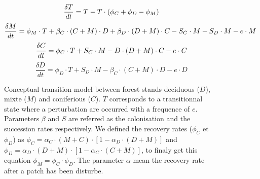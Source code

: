 \begin{figure}[!ht]
	\centering
	\begin{minipage}{0.45\linewidth}
		
	\end{minipage}
	\begin{minipage}[t]{1\linewidth}
\small{\begin{equation}
	 	\frac{\delta T}{dt} = T - T \cdot (\phi_C +\phi_D - \phi_M) \\
\end{equation}
\begin{equation}
		\frac{\delta M}{dt} = \phi_M\cdot T +  \beta_C \cdot (C+M)\cdot D + \beta_D\cdot (D+M)\cdot C - S_C\cdot M -S_D\cdot M - e\cdot M \\
\end{equation}
\begin{equation}
		\frac{\delta C}{dt} = \phi_C \cdot T + S_C\cdot M - D\cdot (D+M)\cdot C - e \cdot C \\
\end{equation}
\begin{equation}
		\frac{\delta D}{dt} = \phi_D \cdot T + S_D \cdot M - \beta_C \cdot (C+M) \cdot D - e \cdot D
\end{equation}}
	\end{minipage}

\caption{Conceptual transition model between forest stands deciduous ($D$), mixte ($M$) and coniferious ($C$). $T$ corresponds to a transitionnal state where a perturbation are occurred with a frequence of $e$. Parameters $\beta$ and $S$ are referred as the colonisation and the succession rates respectively. We defined the recovery rates ($\phi_C$ et $\phi_D$) as $\phi_C = \alpha_C \cdot (M+C) \cdot [1- \alpha_D \cdot (D +M)]$ and $\phi_D = \alpha_D \cdot (D+M) \cdot [1- \alpha_C \cdot (C +M)]$, to finaly get this equation $\phi_M = \phi_C \cdot \phi_D$. The parameter $\alpha$ mean the recovery rate after a patch has been disturbe.}

\label{Model}

\end{figure}



